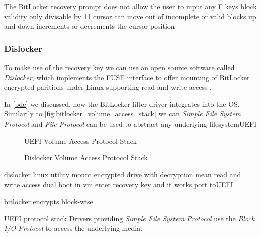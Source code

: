 

The BitLocker recovery prompt does not allow the user to input any
F keys
block validity
only divisable by 11
\cite[9. BitLocker Key Recovery]{windows-internals-6-part2}
cursor can move out of incomplete or valid blocks
up and down increments or decrements the cursor position

\subsubsection{Dislocker}

To make use of the recovery key we can use an open source software called \emph{Dislocker}, which implements the \ac{FUSE} interface to offer mounting of BitLocker encrypted paritions under Linux supporting read and write access \cite{dislocker}.

In \autoref{bde} we discussed, how the BitLocker filter driver integrates into the \ac{OS}. Similarily to \autoref{fig:bitlocker_volume_access_stack} we can  \emph{Simple File System Protocol} and \emph{File Protocol} can be used to abstract any underlying filesystem\ac{UEFI}


\begin{figure}[htb]%
    \centering
    
    \caption{\ac{UEFI} Volume Access Protocol Stack}%
    \label{fig:uefi_volume_access_stack}%
\end{figure}

\begin{figure}[htb]%
    \centering
    
    \caption{Dislocker Volume Access Protocol Stack}%
    \label{fig:dislocker_volume_access_stack}%
\end{figure}


dislocker linux utility
\cite{dislocker}
mount encrypted drive with decryption mean
read and write access
dual boot in vm
enter recovery key and it works
port to\ac{UEFI}

bitlocker encrypts block-wise

\ac{UEFI} protocol stack
\cite[13.3.2 Partition Disocvery]{uefi-spec}
Drivers providing \emph{Simple File System Protocol} use the \emph{Block I/O Protocol} to access the underlying media.


